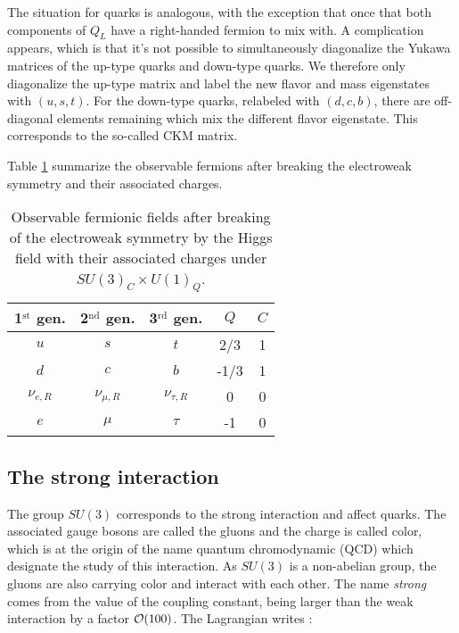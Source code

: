     The situation for quarks is analogous, with the exception that once that both components
    of $Q_L$ have a right-handed fermion to mix with. A complication appears, which is that
    it's not possible to simultaneously diagonalize the Yukawa matrices of the up-type
    quarks and down-type quarks. We therefore only diagonalize the up-type matrix and
    label the new flavor and mass eigenstates with $(u,s,t)$. For the down-type quarks,
    relabeled with $(d,c,b)$, there are off-diagonal elements remaining which mix the
    different flavor eigenstate. This corresponds to the so-called CKM matrix.

    Table \ref{tab:StandardModelFieldsAfterElectroweakBreaking} summarize the observable
    fermions after breaking the electroweak symmetry and their associated charges.

    \begin{table}
        \centering
        \begin{tabular}{|ccc||cc|}
            \hline
            1$^\text{st}$ gen. & 2$^\text{nd}$ gen. & 3$^\text{rd}$ gen.  & $Q$  & $C$\\
            \hline
            \hline
            $u$                & $s$                & $t$                 &  2/3 & 1  \\
            $d$                & $c$                & $b$                 & -1/3 & 1  \\
            \hline
            \hline
            $\nu_{e,R}$        & $\nu_{\mu,R}$      & $\nu_{\tau,R}$      &  0   & 0  \\
            $e$                & $\mu$              & $\tau$              & -1   & 0  \\
            \hline
        \end{tabular}
        \caption{Observable fermionic fields after breaking of the electroweak symmetry
        by the Higgs field with their associated charges under $SU(3)_C \times U(1)_Q$.}
        \label{tab:StandardModelFieldsAfterElectroweakBreaking}
    \end{table}

    \subsection{The strong interaction \label{sec:strongInteraction}}

    The group $SU(3)$ corresponds to the strong interaction and affect quarks. The
    associated gauge bosons are called the gluons and the charge is called color, which
    is at the origin of the name quantum chromodynamic (QCD) which designate the
    study of this interaction. As $SU(3)$ is a non-abelian group, the gluons are also
    carrying color and interact with each other.
    The name \emph{strong} comes from the value of the coupling constant, being larger
    than the weak interaction by a factor $\mathcal{O}(100)$. The Lagrangian writes :


